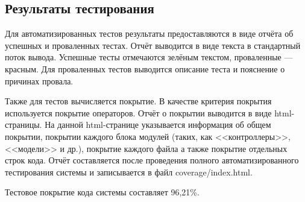 \subsection{Результаты тестирования}

Для автоматизированных тестов результаты предоставляются в виде отчёта об успешных и проваленных тестах. Отчёт выводится в виде текста в стандартный поток вывода. Успешные тесты отмечаются зелёным текстом, проваленные --- красным. Для проваленных тестов выводится описание теста и пояснение о причинах провала.

Также для тестов вычисляется покрытие. В качестве критерия покрытия используется покрытие операторов. Отчёт о покрытии выводится в виде html-страницы. На данной html-странице указывается информация об общем покрытии, покрытии каждого блока модулей (таких, как <<контроллеры>>, <<модели>> и др.), покрытие каждого файла а также покрытие отдельных строк кода. Отчёт составляется после проведения полного автоматизированного тестирования системы и записывается в файл coverage/index.html.

Тестовое покрытие кода системы составляет 96,21\%.
